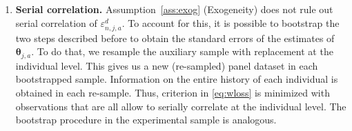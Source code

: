 \begin{enumerate}
\item \textbf{Serial correlation.} Assumption~\ref{ass:exog} (Exogeneity) does not rule out serial correlation of $\varepsilon^d_{n,j,a}$. To account for this, it is possible to bootstrap the two steps described before to obtain the standard errors of the estimates of $ \bm{\theta}_{j,a}$. To do that, we resample the auxiliary sample with replacement at the individual level. This gives us a new (re-sampled) panel dataset in each bootstrapped sample. Information on the entire history of each individual is obtained in each re-sample. Thus, criterion in \eqref{eq:wloss} is minimized with observations that are all allow to serially correlate at the individual level. The bootstrap procedure in the experimental sample is analogous.

\end{enumerate}









\pagebreak
\singlespace






